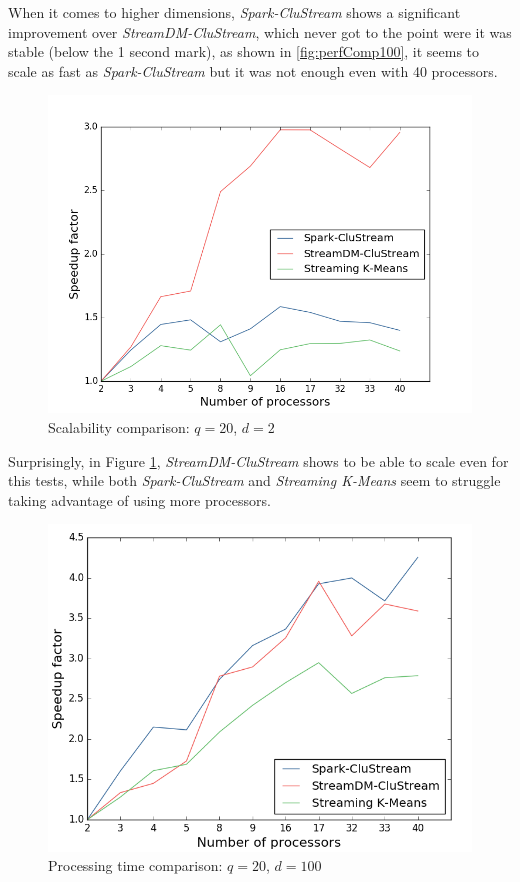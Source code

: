 \documentclass[10pt, conference, compsocconf]{IEEEtran}
\begin{document}
When it comes to higher dimensions, \textit{Spark-CluStream} shows a significant improvement over \textit{StreamDM-CluStream}, which never got to the point were it was stable (below the 1 second mark), as shown in \ref{fig:perfComp100}, it seems to scale as fast as \textit{Spark-CluStream} but it was not enough even with 40 processors. 


\begin{figure}[h!]
 \centering
 \includegraphics[scale=0.45]{./styles/scalComp2.png}
 \caption{Scalability comparison: $q=20$, $d=2$}
 \label{fig:scalComp2}
\end{figure}

Surprisingly, in Figure \ref{fig:scalComp2}, \textit{StreamDM-CluStream} shows to be able to scale even for this tests, while both \textit{Spark-CluStream} and \textit{Streaming K-Means} seem to struggle taking advantage of using more processors.

\begin{figure}[h!]
 \centering
 \includegraphics[scale=0.45]{./styles/scalComp100.png}
 \caption{Processing time comparison: $q=20$, $d=100$}
 \label{fig:scalComp100}
\end{figure}
\end{document}
